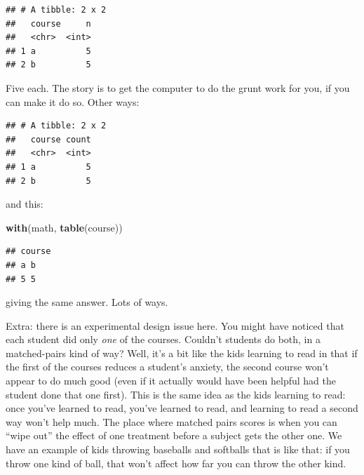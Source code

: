\documentclass[]{tufte-book}
\newenvironment{Shaded}{}{}
\newcommand{\DataTypeTok}[1]{\textcolor[rgb]{0.56,0.13,0.00}{#1}}
\newcommand{\KeywordTok}[1]{\textcolor[rgb]{0.00,0.44,0.13}{\textbf{#1}}}
\newcommand{\NormalTok}[1]{#1}
\newcommand{\OperatorTok}[1]{\textcolor[rgb]{0.40,0.40,0.40}{#1}}
\newcommand{\StringTok}[1]{\textcolor[rgb]{0.25,0.44,0.63}{#1}}
\theoremstyle{definition}
\theoremstyle{definition}
\theoremstyle{definition}
\theoremstyle{remark}
\begin{document}
\begin{Shaded}
\end{Shaded}

\begin{verbatim}
## # A tibble: 2 x 2
##   course     n
##   <chr>  <int>
## 1 a          5
## 2 b          5
\end{verbatim}

Five each. The story is to get the computer to do the grunt work for
you, if you can make it do so. Other ways:

\begin{Shaded}
\end{Shaded}

\begin{verbatim}
## # A tibble: 2 x 2
##   course count
##   <chr>  <int>
## 1 a          5
## 2 b          5
\end{verbatim}

and this:

\begin{Shaded}
\begin{Highlighting}[]
\KeywordTok{with}\NormalTok{(math, }\KeywordTok{table}\NormalTok{(course))}
\end{Highlighting}
\end{Shaded}

\begin{verbatim}
## course
## a b 
## 5 5
\end{verbatim}

giving the same answer. Lots of ways.

Extra: there is an experimental design issue here. You might have
noticed that each student did only \emph{one} of the courses. Couldn't
students do both, in a matched-pairs kind of way? Well, it's a bit like
the kids learning to read in that if the first of the courses reduces a
student's anxiety, the second course won't appear to do much good (even
if it actually would have been helpful had the student done that one
first). This is the same idea as the kids learning to read: once you've
learned to read, you've learned to read, and learning to read a second
way won't help much. The place where matched pairs scores is when you
can ``wipe out'' the effect of one treatment before a subject gets the
other one. We have an example of kids throwing baseballs and softballs
that is like that: if you throw one kind of ball, that won't affect how
far you can throw the other kind.
\end{document}
